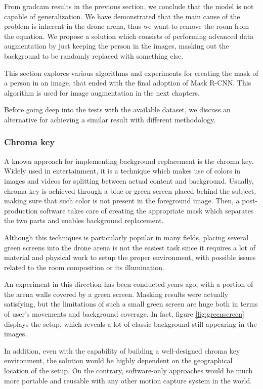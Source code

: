 From \gls{gradcam} results in the previous section, we conclude that the model is not capable of generalization. We have demonstrated that the main cause of the problem is inherent in the drone arena, thus we want to remove the room from the equation. We propose a solution which consists of performing advanced data augmentation by just keeping the person in the images, masking out the background to be randomly replaced with something else.

This section explores various algorithms and experiments for creating the mask of a person in an image, that ended with the final adoption of Mask R-CNN. This algorithm is used for image augmentation in the next chapters.

\medskip

Before going deep into the tests with the available dataset, we discuss an alternative for achieving a similar result with different methodology.

\subsubsection*{Chroma key}

A known approach for implementing background replacement is the chroma key. Widely used in entertainment, it is a technique which makes use of colors in images and videos for splitting between actual content and background. Usually, chroma key is achieved through a blue or green screen placed behind the subject, making sure that such color is not present in the foreground image. Then, a post-production software takes care of creating the appropriate mask which separates the two parts and enables background replacement.

Although this techniques is particularly popular in many fields, placing several green screens into the drone arena is not the easiest task since it requires a lot of material and physical work to setup the proper environment, with possible issues related to the room composition or its illumination.

An experiment in this direction has been conducted years ago, with a portion of the arena walls covered by a green screen. Masking results were actually satisfying, but the limitations of such a small green screen are huge both in terms of user's movements and background coverage. In fact, figure \ref{fig:greenscreen} displays the setup, which reveals a lot of classic background still appearing in the images.

In addition, even with the capability of building a well-designed chroma key environment, the solution would be highly dependent on the geographical location of the setup. On the contrary, software-only approaches would be much more portable and reusable with any other motion capture system in the world.

